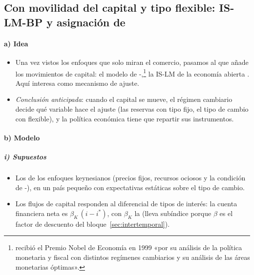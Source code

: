 \documentclass[11pt]{article}
\begin{document}
\subsection{Con movilidad del capital y tipo flexible:\cortetitulo{} IS-LM-BP y asignación de }\label{sec:is-lm-bp}

\paragraph{a) Idea}

\begin{itemize}
\item Una vez vistos los enfoques que solo miran el comercio, pasamos al que añade los movimientos de capital: el modelo de -\nocite{Fleming1962Domestic,Mundell1963Capital},\footnote{ recibió el Premio Nobel de Economía en 1999 «por su análisis de la política monetaria y fiscal con distintos regímenes cambiarios y su análisis de las áreas monetarias óptimas»\nocite{Nobel1999Mundell}.} la IS-LM de la economía abierta . Aquí interesa como mecanismo de ajuste.
\item \emph{Conclusión anticipada}: cuando el capital se mueve, el régimen cambiario decide qué variable hace el ajuste (las reservas con tipo fijo, el tipo de cambio con flexible), y la política económica tiene que repartir sus instrumentos.
\end{itemize}

\paragraph{b) Modelo}

\subparagraph{i) Supuestos}

\begin{itemize}
\item Los de los enfoques keynesianos (precios fijos, recursos ociosos y la condición de -), en un país pequeño con expectativas estáticas sobre el tipo de cambio.
\item Los flujos de capital responden al diferencial de tipos de interés: la cuenta financiera neta es $\beta_K\,(i-i^*)$, con $\beta_K$ la  (lleva subíndice porque $\beta$ es el factor de descuento del bloque~\ref{sec:intertemporal}).
\end{itemize}
\end{document}
